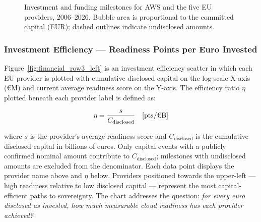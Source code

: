 \begin{figure}[htbp]
  \centering
  \caption{Investment and funding milestones for AWS and the five EU providers, 2006--2026. Bubble area is proportional to the committed capital (EUR); dashed outlines indicate undisclosed amounts.}
  \label{fig:financial_row2}
\end{figure}

\subsubsection{Investment Efficiency — Readiness Points per Euro Invested}
\label{subsubsec:chart_efficiency}

Figure~\ref{fig:financial_row3_left} is an investment efficiency scatter in which each EU provider is plotted with cumulative disclosed capital on the log-scale X-axis (€M) and current average readiness score on the Y-axis. The efficiency ratio $\eta$ plotted beneath each provider label is defined as:

\begin{equation}
  \eta = \frac{s}{C_{\text{disclosed}}} \quad [\text{pts/\texteuro{}B}] \label{eq:efficiency}
\end{equation}

\noindent where $s$ is the provider's average readiness score and $C_{\text{disclosed}}$ is the cumulative disclosed capital in billions of euros. Only capital events with a publicly confirmed nominal amount contribute to $C_{\text{disclosed}}$; milestones with undisclosed amounts are excluded from the denominator. Each data point displays the provider name above and $\eta$ below. Providers positioned towards the upper-left --- high readiness relative to low disclosed capital --- represent the most capital-efficient paths to sovereignty. The chart addresses the question: \emph{for every euro disclosed as invested, how much measurable cloud readiness has each provider achieved?}

